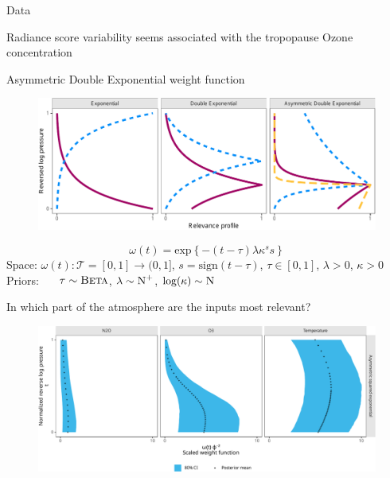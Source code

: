 \documentclass[final]{beamer}
\newlength{\colwidth}
\begin{document}
\begin{frame}[t]
\begin{columns}[t]
\begin{column}{\colwidth}
\begin{block}{Data}
      \begin{center}
        Radiance score variability seems associated with the tropopause Ozone
        concentration
      \end{center}
    \end{block}

    \begin{block}{Asymmetric Double Exponential weight function}
      \begin{figure}
        \centering
        \includegraphics[width=\linewidth]{inc/mls_weight_profiles}
      \end{figure}

      \begin{equation}
        \omega(t)
        =
        \text{exp}\left\{-(t - \tau)\lambda\kappa^s s\right\}
      \end{equation}
      Space:
      $\omega(t): \mathcal{T} = [0, 1] \to (0, 1]$,
      $s = \text{sign}(t - \tau)$,
      $\tau\in[0,1]$,
      $\lambda > 0$,
      $\kappa > 0$ \\
      Priors:
      $\indent\tau \sim \textsc{Beta}$,
      $\lambda \sim \textsc{N}^{+}$,
      $\log(\kappa) \sim \textsc{N}$
    \end{block}


    \begin{block}{In which part of the atmosphere are the inputs most relevant?}
      \begin{figure}
        \centering
        \includegraphics[width=\textwidth]{inc/mmls_weight_posterior_mini1}
        \label{fig:mmls-weight-posterior-mini1}
      \end{figure}
    \end{block}


\end{column}
\end{columns}
\end{frame}
\end{document}
